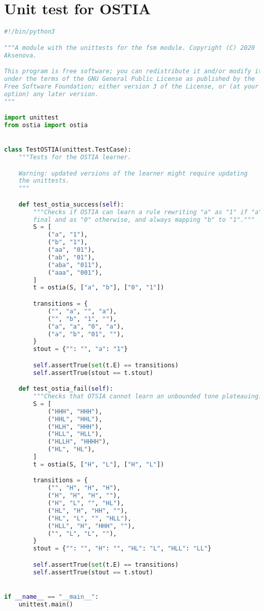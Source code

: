 \section{Unit test for OSTIA}

\begin{lstlisting}[language=Python]
#!/bin/python3

"""A module with the unittests for the fsm module. Copyright (C) 2020  Alena
Aksenova.

This program is free software; you can redistribute it and/or modify it
under the terms of the GNU General Public License as published by the
Free Software Foundation; either version 3 of the License, or (at your
option) any later version.
"""

import unittest
from ostia import ostia


class TestOSTIA(unittest.TestCase):
    """Tests for the OSTIA learner.

    Warning: updated versions of the learner might require updating
    the unittests.
    """

    def test_ostia_success(self):
        """Checks if OSTIA can learn a rule rewriting "a" as "1" if "a" is
        final and as "0" otherwise, and always mapping "b" to "1"."""
        S = [
            ("a", "1"),
            ("b", "1"),
            ("aa", "01"),
            ("ab", "01"),
            ("aba", "011"),
            ("aaa", "001"),
        ]
        t = ostia(S, ["a", "b"], ["0", "1"])

        transitions = {
            ("", "a", "", "a"),
            ("", "b", "1", ""),
            ("a", "a", "0", "a"),
            ("a", "b", "01", ""),
        }
        stout = {"": "", "a": "1"}

        self.assertTrue(set(t.E) == transitions)
        self.assertTrue(stout == t.stout)

    def test_ostia_fail(self):
        """Checks that OTSIA cannot learn an unbounded tone plateauing."""
        S = [
            ("HHH", "HHH"),
            ("HHL", "HHL"),
            ("HLH", "HHH"),
            ("HLL", "HLL"),
            ("HLLH", "HHHH"),
            ("HL", "HL"),
        ]
        t = ostia(S, ["H", "L"], ["H", "L"])

        transitions = {
            ("", "H", "H", "H"),
            ("H", "H", "H", ""),
            ("H", "L", "", "HL"),
            ("HL", "H", "HH", ""),
            ("HL", "L", "", "HLL"),
            ("HLL", "H", "HHH", ""),
            ("", "L", "L", ""),
        }
        stout = {"": "", "H": "", "HL": "L", "HLL": "LL"}

        self.assertTrue(set(t.E) == transitions)
        self.assertTrue(stout == t.stout)


if __name__ == "__main__":
    unittest.main()

\end{lstlisting}